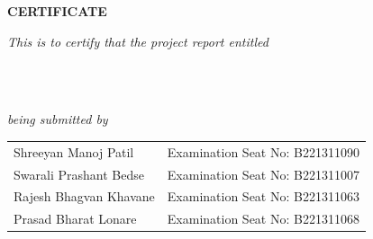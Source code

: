

\begin{center}
\vspace*{3\baselineskip} %
{\Large \bf{CERTIFICATE}} \\
\end{center}

\vspace{0.4cm}
\centerline{\textit{This is to certify that the project report entitled}}
\vspace*{0.6\baselineskip} %

{\bfseries \fontsize{16}{12} \centering\selectfont{MolVista AI}  \\}
\vspace*{0.3\baselineskip} %
{\bfseries \fontsize{14}{12} \centering\selectfont{Deep Learning Based Platform for Molecular Docking and Binding Affinity Prediction}  \\}
\vspace*{0.6\baselineskip} %

\centerline{\textit{being submitted by}} 
\vspace*{0.5\baselineskip} %

{\large \begin{center}
\begin{tabular}{l l}
Shreeyan Manoj Patil        & Examination Seat No: B221311090  \\
Swarali Prashant Bedse        & Examination Seat No: B221311007  \\
Rajesh Bhagvan Khavane            & Examination Seat No: B221311063 \\
Prasad Bharat Lonare        & Examination Seat No: B221311068  \\
\end{tabular}
\end{center}}


